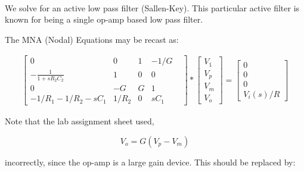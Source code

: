 \documentclass[10pt,notitlepage,onecolumn,aps,pra]{revtex4-1}
\begin{document}
    \begin{center}
    \end{center}
    { \hspace*{\fill} \\}
    
    We solve for an active low pass filter (Sallen-Key). This particular
active filter is known for being a single op-amp based low pass filter.

The MNA (Nodal) Equations may be recast as:

\[
\begin{gather}
\begin{bmatrix}
   0& 0& 1& -1/G\\   
   −\frac{1}{1+s R_2 C_2}& 1& 0& 0&\\
   0& −G& G& 1&\\
   -1/R_1-1/R_2-sC_1& 1/R_2& 0& sC_1&
   \end{bmatrix}
   *
   \begin{bmatrix} V_1 \\ V_p \\ V_m\\ V_o \end{bmatrix}
   =
   \begin{bmatrix} 0\\ 0\\ 0\\ V_i(s)/R \end{bmatrix}
\end{gather}
\]

Note that the lab assignment sheet used,

\[ V_o=G(V_p −V_m) \]

incorrectly, since the op-amp is a large gain device. This should be
replaced by:
\end{document}
